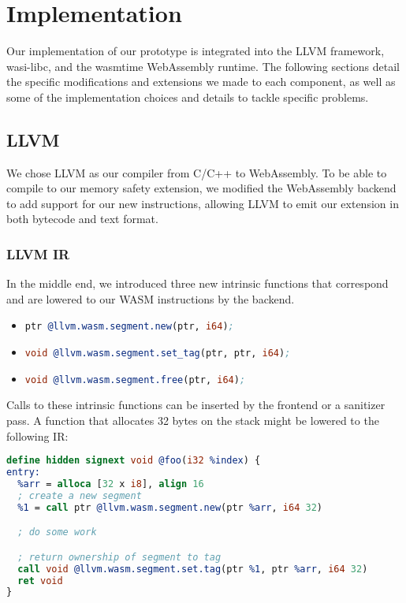 \chapter{Implementation}
\label{ch:implementation}

Our implementation of our prototype is integrated into the LLVM framework, wasi-libc, and the wasmtime WebAssembly runtime.
The following sections detail the specific modifications and extensions we made to each component, as well as some of the implementation choices and details to tackle specific problems.

\section{LLVM}
\label{sec:llvm}

We chose LLVM as our compiler from C/C++ to WebAssembly.
To be able to compile to our memory safety extension, we modified the WebAssembly backend to add support for our new instructions, allowing LLVM to emit our extension in both bytecode and text format.

\subsection{LLVM IR}
\label{subsec:llvm-ir}

In the middle end, we introduced three new intrinsic functions that correspond and are lowered to our \ac{WASM} instructions by the backend.
\begin{itemize}
  \item \lstinline[style=customc,language=llvm]{ptr @llvm.wasm.segment.new(ptr, i64);}
  \item \lstinline[style=customc,language=llvm]{void @llvm.wasm.segment.set_tag(ptr, ptr, i64);}
  \item \lstinline[style=customc,language=llvm]{void @llvm.wasm.segment.free(ptr, i64);}
\end{itemize}
Calls to these intrinsic functions can be inserted by the frontend or a sanitizer pass.
A function that allocates 32 bytes on the stack might be lowered to the following IR:

\begin{lstlisting}[frame=h,style=customc,
    label={lst:llvm-intrinsics},language=llvm]
define hidden signext void @foo(i32 %index) {
entry:
  %arr = alloca [32 x i8], align 16
  ; create a new segment
  %1 = call ptr @llvm.wasm.segment.new(ptr %arr, i64 32)

  ; do some work

  ; return ownership of segment to tag
  call void @llvm.wasm.segment.set.tag(ptr %1, ptr %arr, i64 32)
  ret void
}
\end{lstlisting}

